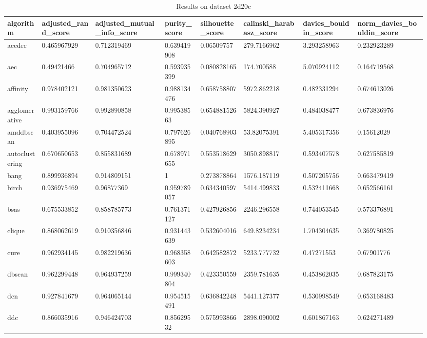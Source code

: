 \begin{table}[H]
\centering
\caption{Results on dataset 2d20c}
\label{tab:params:2d20c}
\begin{tabular}{|l|l|l|l|l|l|l|l|}
\hline
algorithm & adjusted\_rand\_score & adjusted\_mutual\_info\_score & purity\_score & silhouette\_score & calinski\_harabasz\_score & davies\_bouldin\_score & norm\_davies\_bouldin\_score \\
\hline
acedec & 0.465967929 & 0.712319469 & 0.639419908 & 0.06509757 & 279.7166962 & 3.293258963 & 0.232923289 \\
\hline
aec & 0.49421466 & 0.704965712 & 0.593935399 & 0.080828165 & 174.700588 & 5.070924112 & 0.164719568 \\
\hline
affinity & 0.978402121 & 0.981350623 & 0.988134476 & 0.658758807 & 5972.862218 & 0.482331294 & 0.674613026 \\
\hline
agglomerative & 0.993159766 & 0.992890858 & 0.99538563 & 0.654881526 & 5824.390927 & 0.484038477 & 0.673836976 \\
\hline
amddbscan & 0.403955096 & 0.704472524 & 0.797626895 & 0.040768903 & 53.82075391 & 5.405317356 & 0.15612029 \\
\hline
autoclustering & 0.670650653 & 0.855831689 & 0.678971655 & 0.553518629 & 3050.898817 & 0.593407578 & 0.627585819 \\
\hline
bang & 0.899936894 & 0.914809151 & 1 & 0.273878864 & 1576.187119 & 0.507205756 & 0.663479419 \\
\hline
birch & 0.936975469 & 0.96877369 & 0.959789057 & 0.634340597 & 5414.499833 & 0.532411668 & 0.652566161 \\
\hline
bsas & 0.675533852 & 0.858785773 & 0.761371127 & 0.427926856 & 2246.296558 & 0.744053545 & 0.573376891 \\
\hline
clique & 0.868062619 & 0.910356846 & 0.931443639 & 0.532604016 & 649.8234234 & 1.704304635 & 0.369780825 \\
\hline
cure & 0.962934145 & 0.982219636 & 0.968358603 & 0.642582872 & 5233.777732 & 0.47271553 & 0.67901776 \\
\hline
dbscan & 0.962299448 & 0.964937259 & 0.999340804 & 0.423350559 & 2359.781635 & 0.453862035 & 0.687823175 \\
\hline
dcn & 0.927841679 & 0.964065144 & 0.954515491 & 0.636842248 & 5441.127377 & 0.530998549 & 0.653168483 \\
\hline
ddc & 0.866035916 & 0.946424703 & 0.85629532 & 0.575993866 & 2898.090002 & 0.601867163 & 0.624271489 \\
\hline

\end{tabular}
\end{table}
